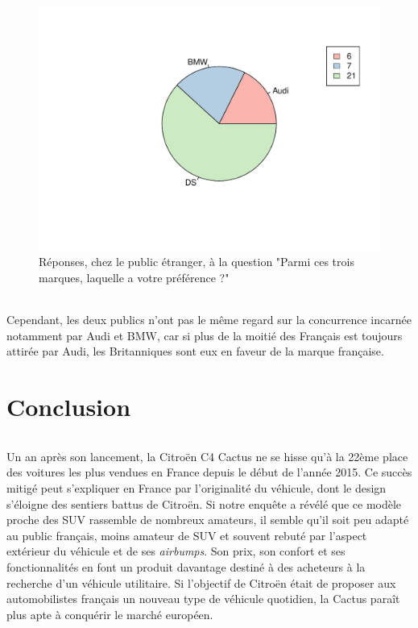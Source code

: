 \documentclass[12pt]{article}\usepackage[]{graphicx}\usepackage[]{color}
\makeatletter
\def\maxwidth{ %
  \ifdim\Gin@nat@width>\linewidth
    \linewidth
  \else
    \Gin@nat@width
  \fi
}
\newenvironment{knitrout}{}{} %
\makeatother
\begin{document}
\begin{knitrout}
\color{fgcolor}\begin{figure}[H]
\includegraphics[width=\maxwidth]{figure/preference_en-1} \caption[Réponses, chez le public étranger, à la question "Parmi ces trois marques, laquelle a votre préférence ?"]{Réponses, chez le public étranger, à la question "Parmi ces trois marques, laquelle a votre préférence ?"}\label{fig:preference en}
\end{figure}


\end{knitrout}

\paragraph{} Cependant, les deux publics n'ont pas le même regard sur la concurrence
incarnée notamment par Audi et BMW, car si plus de la moitié des Français est
toujours attirée par Audi, les Britanniques sont eux en faveur de la marque française.

\break

\part{Conclusion}

\paragraph{} Un an après son lancement, la Citroën C4 Cactus ne se hisse qu'à la 22ème place des voitures les plus vendues en France depuis le début de l’année 2015. Ce succès mitigé peut s'expliquer en France par l'originalité du véhicule, dont le design s'éloigne des sentiers battus de Citroën. Si notre enquête a révélé que ce modèle proche des SUV rassemble de nombreux amateurs, il semble qu'il soit peu adapté au public français, moins amateur de SUV et souvent rebuté par l'aspect extérieur du véhicule et de ses \textit{airbumps}. Son prix, son confort et ses fonctionnalités en font un produit davantage destiné à des acheteurs à la recherche d'un véhicule utilitaire. Si l'objectif de Citroën était de proposer aux automobilistes français un nouveau type de véhicule quotidien, la Cactus paraît plus apte à conquérir le marché européen.
\end{document}
